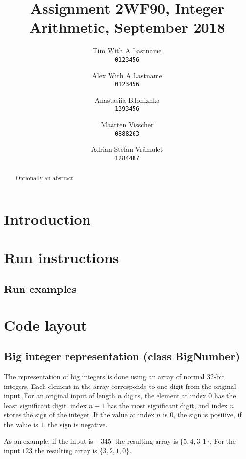 \documentclass[a4paper]{article}
\title{Assignment 2WF90, Integer Arithmetic, September 2018}
\author{
    Tim With A Lastname\\
    \texttt{0123456}
    \and
    Alex With A Lastname\\
    \texttt{0123456}
    \and
    Anastasiia Bilonizhko\\
    \texttt{1393456}
    \and
    Maarten Visscher\\
    \texttt{0888263}
    \and
    Adrian Stefan Vr\^amulet\\
    \texttt{1284487}
}
\begin{document}
\maketitle



\begin{abstract}
Optionally an abstract.
\end{abstract}

\section*{Introduction}

\tableofcontents




\section{Run instructions}




\subsection{Run examples}


\section{Code layout}

\subsection{Big integer representation (class BigNumber)}

The representation of big integers is done using an array of normal 32-bit integers.
Each element in the array corresponds to one digit from the original input.
For an original input of length $n$ digits, the element at index $0$ has the least significant digit,
index $n-1$ has the most significant digit, and index $n$ stores the sign of the integer.
If the value at index $n$ is 0, the sign is positive, if the value is $1$, the sign is negative.

As an example, if the input is $-345$, the resulting array is $\{5, 4, 3, 1\}$.
For the input $123$ the resulting array is $\{3, 2, 1, 0\}$.
\end{document}
